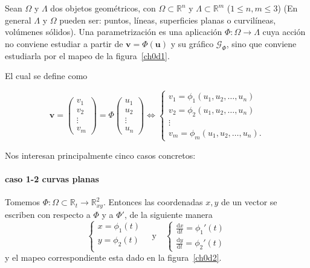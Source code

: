 \documentclass[mid,fleqn,draft,twoside]{notasdeclase}
\newcommand{\ve}[1]{\bm{#1}}
\newcommand{\dt}[2]{#1_1 #2 #1_2 #2 \dots #2 #1_n}
\newcommand{\Rn}{\mathbb{R}^n}
\newcommand{\Rm}{\mathbb{R}^m}
\newcommand{\R}{\mathbb{R}}
\begin{document}
\begin{defi}[parametrización]
	Sean $\Omega$ y $\Lambda$ dos objetos geométricos, con $\Omega\subset\Rn$ y $\Lambda\subset\Rm$ ($1\leq n,m\leq3$) (En general $\Lambda$ y $\Omega$ pueden ser: puntos, líneas, superficies planas o curvilíneas, volúmenes sólidos). Una parametrización es una aplicación $\Phi\colon\Omega\to\Lambda$ cuya acción no conviene estudiar a partir de $\ve v= \Phi(\ve u)$ y su gráfico $\mathcal{G}_\Phi$, sino que conviene estudiarla por el mapeo de la figura~\ref{ch0d1}.
%	

El cual se define como

\[
	\ve v = \begin{pmatrix}
	v_1 \\ v_2 \\ \vdots \\ v_m
	\end{pmatrix} = 
	\Phi\begin{pmatrix}
	u_1\\u_2\\ \vdots\\ u_n
	\end{pmatrix} 
	\iff \begin{cases}
	v_1 = \phi_1(\dt{u}{,}) \\
	v_2 = \phi_2(\dt{u}{,}) \\
	\vdots \\
	v_m = \phi_m(\dt{u}{,}).
	\end{cases}
\]

\end{defi}

Nos interesan principalmente cinco casos concretos:


\paragraph{caso 1-2 curvas planas} Tomemos $\Phi\colon\Omega\subset\R_t\to\R^2_{xy}$. Entonces las coordenadas $x,y$ de un vector se escriben con respecto a $\Phi$ y a $\Phi'$, de la siguiente manera
%
\[ 
\begin{cases}
x = \phi_1(t) \\
y = \phi_2(t) \\
\end{cases} \quad\text{y}
\quad\begin{cases}\displaystyle
\frac{\mathrm dx}{\mathrm dt} = \phi_1'(t) \\[.8em] \displaystyle
\frac{\mathrm dy}{\mathrm dt} = \phi_2'(t)
\end{cases}
 \]
y el mapeo correspondiente esta dado en la figura~\ref{ch0d2}.
\end{document}
